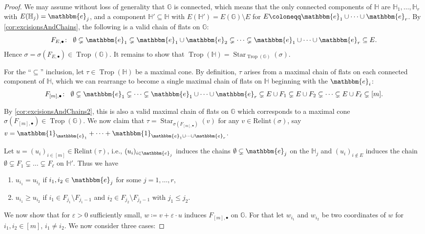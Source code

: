 \documentclass[11pt,reqno,a4paper]{amsart}
\theoremstyle{theoremstyle}
\theoremstyle{examplestyle}
\theoremstyle{algorithmstyle}
\newcommand{\ee}{\mathbbm{e}}
\newcommand{\GG}{\mathbb{G}}
\newcommand{\HH}{\mathbb{H}}
\newcommand{\bbone}{\mathbbm{1}}
\DeclareMathOperator{\Trop}{Trop}
\DeclareMathOperator{\Star}{Star}
\begin{document}
\begin{proof}
  We may assume without loss of generality that $\GG$ is connected, which means that the only connected components of $\HH$ are $\HH_1,\dots,\HH_r$ with $E(\HH_j)=\ee_j$, and a component $\HH'\subseteq\HH$ with $E(\HH')=E(\GG)\setminus E$ for $E\coloneqq \ee_1\cup\dots\cup\ee_r$.  By \cref{cor:excisionsAndChains}, the following is a valid chain of flats on $\GG$:
  \begin{equation*}
    F_{E,\bullet}\colon\;\; \emptyset\subsetneq \ee_1\subsetneq \ee_1\cup\ee_2\subsetneq\dots\subsetneq \ee_1\cup\dots\cup\ee_r \subseteq E.
  \end{equation*}
  Hence $\sigma=\sigma(F_{E,\bullet})\in\Trop(\GG)$.  It remains to show that $\Trop(\HH)=\Star_{\Trop(\GG)}(\sigma)$.
  
  For the ``$\subseteq$'' inclusion, let $\tau\in\Trop(\HH)$ be a maximal cone.  By definition, $\tau$ arises from a maximal chain of flats on each connected component of $\HH$, which we can rearrange to become a single maximal chain of flats on $\HH$ beginning with the $\ee_i$:
  \begin{equation*}
    F_{[m],\bullet}\colon\;\; \emptyset\subsetneq \ee_1\subsetneq \dots\subsetneq \ee_1\cup\dots\cup\ee_r\subsetneq E\cup F_1\subsetneq E\cup F_2\subsetneq\dots\subsetneq E\cup F_\ell\subsetneq [m].
  \end{equation*}

  By \cref{cor:excisionsAndChains2}, this is also a valid maximal chain of flats on $\GG$ which corresponds to a maximal cone $\sigma(F_{[m],\bullet})\in\Trop(\GG)$.  We now claim that $\tau=\Star_{\sigma(F_{[m],\bullet})}(v)$ for any $v\in\mathrm{Relint}(\sigma)$, say $v = \bbone_{\ee_1}+\dots+\bbone_{\ee_1\cup\dots\cup\ee_r}$.

  Let $u=(u_i)_{i\in[m]}\in \mathrm{Relint}(\tau)$, i.e., $(u_i)_{i\in\ee_j}$ induces the chains $\emptyset\subsetneq \ee_j$ on the $\HH_j$ and $(u_{i})_{i\notin E}$ induces the chain $\emptyset\subsetneq F_1\subsetneq \dots\subsetneq F_\ell$ on $\HH'$.  Thus we have
  \begin{enumerate}
  \item $u_{i_1}=u_{i_2}$ if $i_1,i_2\in\ee_j$ for some $j=1,\dots,r$,
  \item $u_{i_1}\geq u_{i_2}$ if $i_1\in F_{j_1}\setminus F_{j_1-1}$ and $i_2\in F_{j_2}\setminus F_{j_2-1}$ with $j_1\leq j_2$.
  \end{enumerate}
  We now show that for $\varepsilon>0$ sufficiently small, $w\coloneqq v+\varepsilon\cdot u$ induces $F_{[m],\bullet}$ on $\GG$.
  For that let $w_{i_1}$ and $w_{i_2}$ be two coordinates of $w$ for $i_1, i_2\in [m]$, $i_1\neq i_2$.  We now consider three cases:


\end{proof}
\end{document}
